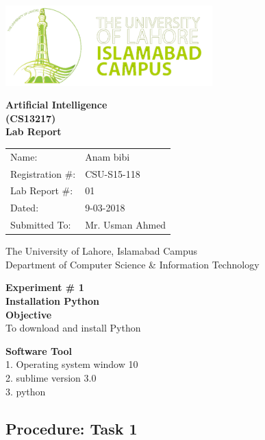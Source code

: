 \documentclass[11pt]{article}            %
\begin{document}
\begin{titlepage}
    \centering
  \vfill
    \includegraphics[width=8cm]{uni_logo.png} \\ 
	\vskip2cm
    {\bfseries\Large
	Artificial Intelligence \\ (CS13217)\\
	
	\vskip2cm
	Lab Report 
	 
	\vskip2cm
	}    

\begin{center}
\begin{tabular}{ l l  } 

Name: & Anam bibi\\ 
Registration \#: & CSU-S15-118 \\ 
Lab Report \#: & 01 \\ 
 Dated:& 9-03-2018\\ 
Submitted To:& Mr. Usman Ahmed\\ 

\end{tabular}
\end{center}
    \vfill
    The University of Lahore, Islamabad Campus\\
Department of Computer Science \& Information Technology
\end{titlepage}


    
    {\bfseries\Large
\centering
	Experiment \# 1 \\

Installation Python\\
	
	}    
 \vskip1cm
 \textbf {Objective}\\  To download and install Python
 
 \textbf {Software Tool} \\
1. Operating system window 10 \\
2.  sublime version 3.0\\
3.  python\\

\subsection{Procedure: Task 1 }     
\end{document}
